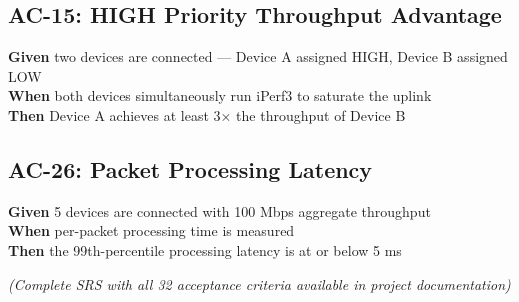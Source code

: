 \subsection{AC-15: HIGH Priority Throughput Advantage}
\textbf{Given} two devices are connected — Device A assigned HIGH, Device B assigned LOW\\
\textbf{When} both devices simultaneously run iPerf3 to saturate the uplink\\
\textbf{Then} Device A achieves at least 3× the throughput of Device B

\subsection{AC-26: Packet Processing Latency}
\textbf{Given} 5 devices are connected with 100 Mbps aggregate throughput\\
\textbf{When} per-packet processing time is measured\\
\textbf{Then} the 99th-percentile processing latency is at or below 5 ms

\textit{(Complete SRS with all 32 acceptance criteria available in project documentation)}
